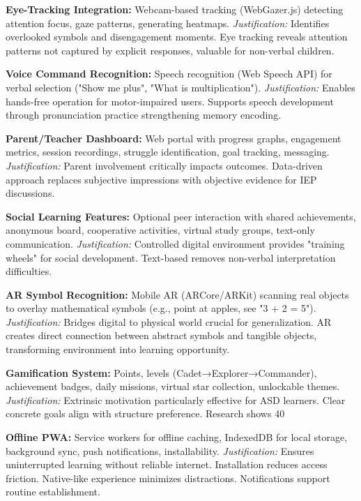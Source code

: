 \documentclass[11pt, a4paper]{article}
\begin{document}
\textbf{Eye-Tracking Integration:} Webcam-based tracking (WebGazer.js) detecting attention focus, gaze patterns, generating heatmaps. \textit{Justification:} Identifies overlooked symbols and disengagement moments. Eye tracking reveals attention patterns not captured by explicit responses, valuable for non-verbal children.

\textbf{Voice Command Recognition:} Speech recognition (Web Speech API) for verbal selection ("Show me plus", "What is multiplication"). \textit{Justification:} Enables hands-free operation for motor-impaired users. Supports speech development through pronunciation practice strengthening memory encoding.

\textbf{Parent/Teacher Dashboard:} Web portal with progress graphs, engagement metrics, session recordings, struggle identification, goal tracking, messaging. \textit{Justification:} Parent involvement critically impacts outcomes. Data-driven approach replaces subjective impressions with objective evidence for IEP discussions.

\textbf{Social Learning Features:} Optional peer interaction with shared achievements, anonymous board, cooperative activities, virtual study groups, text-only communication. \textit{Justification:} Controlled digital environment provides "training wheels" for social development. Text-based removes non-verbal interpretation difficulties.

\textbf{AR Symbol Recognition:} Mobile AR (ARCore/ARKit) scanning real objects to overlay mathematical symbols (e.g., point at apples, see "3 + 2 = 5"). \textit{Justification:} Bridges digital to physical world crucial for generalization. AR creates direct connection between abstract symbols and tangible objects, transforming environment into learning opportunity.

\textbf{Gamification System:} Points, levels (Cadet→Explorer→Commander), achievement badges, daily missions, virtual star collection, unlockable themes. \textit{Justification:} Extrinsic motivation particularly effective for ASD learners. Clear concrete goals align with structure preference. Research shows 40%

\textbf{Offline PWA:} Service workers for offline caching, IndexedDB for local storage, background sync, push notifications, installability. \textit{Justification:} Ensures uninterrupted learning without reliable internet. Installation reduces access friction. Native-like experience minimizes distractions. Notifications support routine establishment.
\end{document}
